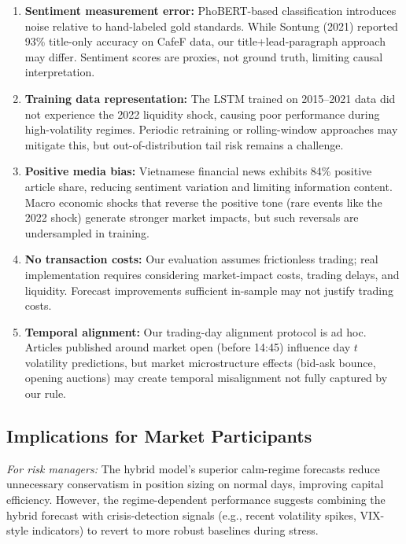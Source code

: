 \begin{enumerate}
    \item \textbf{Sentiment measurement error:} PhoBERT-based classification introduces noise relative to hand-labeled gold standards. While Sontung (2021) reported 93\% title-only accuracy on CafeF data, our title+lead-paragraph approach may differ. Sentiment scores are proxies, not ground truth, limiting causal interpretation.
    
    \item \textbf{Training data representation:} The LSTM trained on 2015--2021 data did not experience the 2022 liquidity shock, causing poor performance during high-volatility regimes. Periodic retraining or rolling-window approaches may mitigate this, but out-of-distribution tail risk remains a challenge.
    
    \item \textbf{Positive media bias:} Vietnamese financial news exhibits 84\% positive article share, reducing sentiment variation and limiting information content. Macro economic shocks that reverse the positive tone (rare events like the 2022 shock) generate stronger market impacts, but such reversals are undersampled in training.
    
    \item \textbf{No transaction costs:} Our evaluation assumes frictionless trading; real implementation requires considering market-impact costs, trading delays, and liquidity. Forecast improvements sufficient in-sample may not justify trading costs.
    
    \item \textbf{Temporal alignment:} Our trading-day alignment protocol is ad hoc. Articles published around market open (before 14:45) influence day $t$ volatility predictions, but market microstructure effects (bid-ask bounce, opening auctions) may create temporal misalignment not fully captured by our rule.
\end{enumerate}

\subsection{Implications for Market Participants}

\textit{For risk managers:} The hybrid model's superior calm-regime forecasts reduce unnecessary conservatism in position sizing on normal days, improving capital efficiency. However, the regime-dependent performance suggests combining the hybrid forecast with crisis-detection signals (e.g., recent volatility spikes, VIX-style indicators) to revert to more robust baselines during stress.

